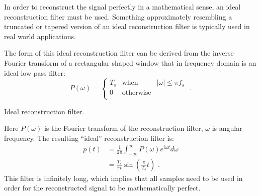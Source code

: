 In order to reconstruct the signal perfectly in a mathematical sense, an ideal reconstruction filter must be used. 
Something approximately resembling a truncated or tapered version of an ideal reconstruction filter is typically used in real world applications.

The form of this ideal reconstruction filter can be derived from the inverse Fourier transform of a rectangular shaped window that in frequency domain is an ideal low pass filter:
\begin{equation}
P(\omega) = \left\{
  \begin{array}{rcr}
    T_s & \mathrm{when} & |\omega| \le \pi f_s \\
    0 & \mathrm{otherwise} & \\
  \end{array}
\right. \,\,.
\end{equation}
\begin{marginfigure}
\begin{center}
\end{center}
\caption{Ideal reconstruction filter.}
\end{marginfigure}
Here $P(\omega)$ is the Fourier transform of the reconstruction
filter, $\omega$ is angular frequency. The resulting ``ideal''
reconstruction filter is:
\begin{align}
p(t)&=\frac{1}{2\pi}\int_{-\infty}^{\infty} P(\omega)e^{i\omega t}d\omega \\
&= \frac{T_s}{\pi t}\sin\left(\frac{\pi}{T_s}t\right)\,\,.
\end{align}
This filter is infinitely long, which implies that all samples need to be used in order for the reconstructed signal to be mathematically perfect.

